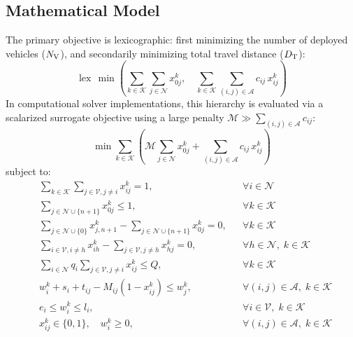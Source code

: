 \subsection{Mathematical Model}
The primary objective is lexicographic: first minimizing the number of deployed vehicles (${N_\mathrm{V}}$), and secondarily minimizing total travel distance (${D_\mathrm{T}}$):
\begin{equation}
  \operatorname{lex}\,\min \left( \sum_{k \in \mathcal{K}} \sum_{j \in \mathcal{N}} x_{0j}^k, \quad \sum_{k \in \mathcal{K}} \sum_{(i,j) \in \mathcal{A}} c_{ij}\,x_{ij}^k \right)
  \label{eq:lexicographic_obj}
\end{equation}
In computational solver implementations, this hierarchy is evaluated via a scalarized surrogate objective using a large penalty $\mathcal{M} \gg \sum_{(i,j) \in \mathcal{A}} c_{ij}$:
\begin{equation}
  \min \sum_{k \in \mathcal{K}} \left( \mathcal{M} \sum_{j \in \mathcal{N}} x_{0j}^k + \sum_{(i,j) \in \mathcal{A}} c_{ij}\,x_{ij}^k \right)
  \label{eq:scalarized_obj}
\end{equation}
subject to:
\begin{align}
  &\sum_{k \in \mathcal{K}} \sum_{j \in \mathcal{V}, j \neq i} x_{ij}^k = 1, &&\forall i \in \mathcal{N} \label{eq:visit_once} \\
  &\sum_{j \in \mathcal{N} \cup \{n+1\}} x_{0j}^k \le 1, &&\forall k \in \mathcal{K} \label{eq:depot_outflow} \\
  &\sum_{j \in \mathcal{N} \cup \{0\}} x_{j, n+1}^k - \sum_{j \in \mathcal{N} \cup \{n+1\}} x_{0j}^k = 0, &&\forall k \in \mathcal{K} \label{eq:depot_inflow} \\
  &\sum_{i \in \mathcal{V}, i \neq h} x_{ih}^k - \sum_{j \in \mathcal{V}, j \neq h} x_{hj}^k = 0, &&\forall h \in \mathcal{N}, \; k \in \mathcal{K} \label{eq:flow_conservation} \\
  &\sum_{i \in \mathcal{N}} q_i \sum_{j \in \mathcal{V}, j \neq i} x_{ij}^k \le Q, &&\forall k \in \mathcal{K} \label{eq:capacity_constraint} \\
  &w_i^k + s_i + t_{ij} - M_{ij} (1 - x_{ij}^k) \le w_j^k, &&\forall (i, j) \in \mathcal{A}, \; k \in \mathcal{K} \label{eq:time_propagation} \\
  &e_i \le w_i^k \le l_i, &&\forall i \in \mathcal{V}, \; k \in \mathcal{K} \label{eq:time_window_bound} \\
  &x_{ij}^k \in \{0, 1\}, \quad w_i^k \ge 0, &&\forall (i, j) \in \mathcal{A}, \; k \in \mathcal{K} \label{eq:variable_domains}
\end{align}


